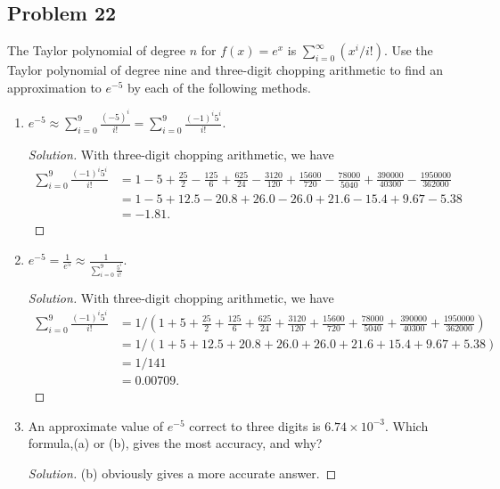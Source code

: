 \documentclass{article}
\begin{document}
\subsection*{Problem 22}
The Taylor polynomial of degree $n$ for $f(x) = e^x$ is $\sum_{i=0}^\infty(x^i/i!)$. Use the Taylor 
polynomial of degree nine and three-digit chopping arithmetic to find an approximation to $e^{-5}$ 
by each of the following methods.
\begin{enumerate}[label=\alph*.]
    \item $e^{-5} \approx \sum\limits_{i=0}^9\frac{(-5)^i}{i!} = 
    \sum\limits_{i=0}^9\frac{(-1)^i5^i}{i!}$.
    \begin{proof}[Solution]
        With three-digit chopping arithmetic, we have
        \begin{align*}
            \sum\limits_{i=0}^9\frac{(-1)^i5^i}{i!} & = 1 - 5 + \frac{25}{2} - \frac{125}{6} + 
            \frac{625}{24} - \frac{3120}{120} + \frac{15600}{720} - \frac{78000}{5040} + 
            \frac{390000}{40300} - \frac{1950000}{362000} \\
            & = 1 - 5 + 12.5 - 20.8 + 26.0 - 26.0 + 21.6 - 15.4 + 9.67 - 5.38 \\
            & = -1.81.
        \end{align*}
    \end{proof}
    
    \item $e^{-5} = \frac{1}{e^5} \approx \frac{1}{\sum_{i=0}^{9}\frac{5^i}{i!}}$.
    \begin{proof}[Solution]
        With three-digit chopping arithmetic, we have
        \begin{align*}
            \sum\limits_{i=0}^9\frac{(-1)^i5^i}{i!} & = 1 / \left(1 + 5 + \frac{25}{2} + \frac{125}{6} + 
            \frac{625}{24} + \frac{3120}{120} + \frac{15600}{720} + \frac{78000}{5040} + 
            \frac{390000}{40300} + \frac{1950000}{362000}\right) \\
            & = 1/ (1 + 5 + 12.5 + 20.8 + 26.0 + 26.0 + 21.6 + 15.4 + 9.67 + 5.38) \\
            & = 1/141 \\
            & = 0.00709.
        \end{align*}
    \end{proof}
    
    \item An approximate value of $e^{-5}$ correct to three digits is $6.74\times 10^{-3}$. 
    Which formula,(a) or (b), gives the most accuracy, and why?
    \begin{proof}[Solution]
        (b) obviously gives a more accurate answer. 
        

\end{proof}
\end{enumerate}
\end{document}
